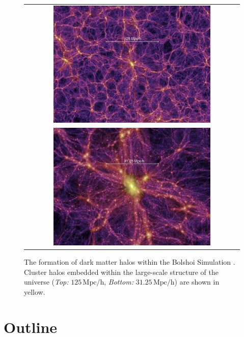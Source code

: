 \begin{figure}
 \centering
 \begin{tabular}{c}
 \includegraphics[width=0.75\textwidth]{images/Introduction/seqD_063a_half.jpg} \\ \includegraphics[width=0.75\textwidth]{images/Introduction/seqF_063a_half.jpg}
 \end{tabular}
 \caption[Bolshoi Simulation]{The formation of dark matter halos within the Bolshoi Simulation \citep{KL11.1}. Cluster halos embedded within the large-scale structure of the universe ({\em Top:} $125 \, \mathrm{Mpc/h}$, {\em Bottom: } $31.25 \, \mathrm{Mpc/h}$) are shown in yellow.}
\label{foot}
\end{figure}

\newpage 

\section{Outline}

